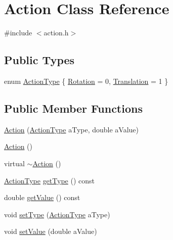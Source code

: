 \hypertarget{classAction}{
\section{Action Class Reference}
\label{classAction}
}


{\ttfamily \#include $<$action.h$>$}

\subsection*{Public Types}
\begin{DoxyCompactItemize}
\item 
enum \hyperlink{classAction_ab1851cee70a9061c928e69d44e6cba0b}{ActionType} \{ \hyperlink{classAction_ab1851cee70a9061c928e69d44e6cba0bab3f4515fff89bb5cc4c35a143e7d949a}{Rotation} =  0, 
\hyperlink{classAction_ab1851cee70a9061c928e69d44e6cba0bae6fc2e20d912178bcd386432c8443e99}{Translation} =  1
 \}
\end{DoxyCompactItemize}
\subsection*{Public Member Functions}
\begin{DoxyCompactItemize}
\item 
\hyperlink{classAction_ac04621d251f1465cac23501f906de535}{Action} (\hyperlink{classAction_ab1851cee70a9061c928e69d44e6cba0b}{ActionType} aType, double aValue)
\item 
\hyperlink{classAction_a4f457ccfc8336b565cadca56b36e0271}{Action} ()
\item 
virtual \hyperlink{classAction_acdb06775d157339256a8ecd55749226c}{$\sim$Action} ()
\item 
\hyperlink{classAction_ab1851cee70a9061c928e69d44e6cba0b}{ActionType} \hyperlink{classAction_a4228bc3ace4c7ff787440a773e82a7a9}{getType} () const 
\item 
double \hyperlink{classAction_ae342d376e783c930a80a580d5a7ab5f5}{getValue} () const 
\item 
void \hyperlink{classAction_a77869bc712f6079e6481a81a135a4dc4}{setType} (\hyperlink{classAction_ab1851cee70a9061c928e69d44e6cba0b}{ActionType} aType)
\item 
void \hyperlink{classAction_a67959f7849af9e06f6b033522adfadc8}{setValue} (double aValue)
\end{DoxyCompactItemize}


